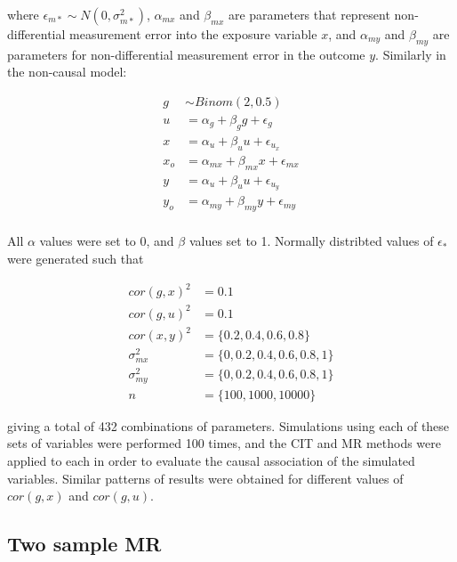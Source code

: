 \documentclass[]{article}
\begin{document}
where \(\epsilon_{m*} \sim N(0, \sigma^2_{m*})\), \(\alpha_{mx}\) and
\(\beta_{mx}\) are parameters that represent non-differential
measurement error into the exposure variable \(x\), and \(\alpha_{my}\)
and \(\beta_{my}\) are parameters for non-differential measurement error
in the outcome \(y\). Similarly in the non-causal model:

\[
\begin{aligned}
g & \sim Binom(2, 0.5) \\
u & = \alpha_g + \beta_g g + \epsilon_g \\
x & = \alpha_u + \beta_u u + \epsilon_{u_x} \\
x_o & = \alpha_{mx} + \beta_{mx} x + \epsilon_{mx} \\
y & = \alpha_u + \beta_u u + \epsilon_{u_y} \\
y_o & = \alpha_{my} + \beta_{my} y + \epsilon_{my} \\
\end{aligned}
\]

All \(\alpha\) values were set to 0, and \(\beta\) values set to 1.
Normally distribted values of \(\epsilon_*\) were generated such that

\[
\begin{aligned}
cor(g, x)^2 & = 0.1 \\
cor(g, u)^2 & = 0.1 \\
cor(x, y)^2 & = \{0.2, 0.4, 0.6, 0.8\} \\
\sigma^2_{mx} & = \{0, 0.2, 0.4, 0.6, 0.8, 1\} \\
\sigma^2_{my} & = \{0, 0.2, 0.4, 0.6, 0.8, 1\} \\
n & = \{100, 1000, 10000\}
\end{aligned}
\]

giving a total of 432 combinations of parameters. Simulations using each
of these sets of variables were performed 100 times, and the CIT and MR
methods were applied to each in order to evaluate the causal association
of the simulated variables. Similar patterns of results were obtained
for different values of \(cor(g, x)\) and \(cor(g, u)\).

\subsection{Two sample MR}\label{two-sample-mr}
\end{document}
